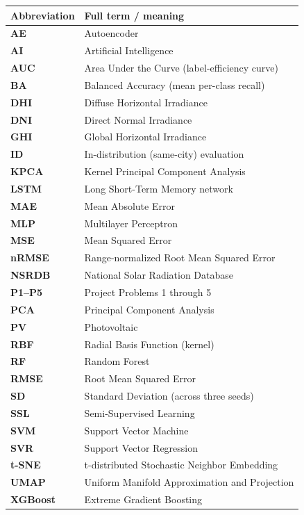 \documentclass[11pt,letterpaper]{article}
\renewcommand{\arraystretch}{1.12}
\begin{document}
\begingroup
\small
\renewcommand{\arraystretch}{1.05}
\setlength{\tabcolsep}{4pt}
\renewcommand{\tabularxcolumn}[1]{m{#1}}
\begin{tabularx}{\textwidth}{@{}>{\bfseries\color{ink}}m{}X@{}}
\toprule
Abbreviation & Full term / meaning \\
\midrule
AE & Autoencoder \\
AI & Artificial Intelligence \\
AUC & Area Under the Curve (label-efficiency curve) \\
BA & Balanced Accuracy (mean per-class recall) \\
DHI & Diffuse Horizontal Irradiance \\
DNI & Direct Normal Irradiance \\
GHI & Global Horizontal Irradiance \\
ID & In-distribution (same-city) evaluation \\
KPCA & Kernel Principal Component Analysis \\
LSTM & Long Short-Term Memory network \\
MAE & Mean Absolute Error \\
MLP & Multilayer Perceptron \\
MSE & Mean Squared Error \\
nRMSE & Range-normalized Root Mean Squared Error \\
NSRDB & National Solar Radiation Database \\
P1--P5 & Project Problems 1 through 5 \\
PCA & Principal Component Analysis \\
PV & Photovoltaic \\
RBF & Radial Basis Function (kernel) \\
RF & Random Forest \\
RMSE & Root Mean Squared Error \\
SD & Standard Deviation (across three seeds) \\
SSL & Semi-Supervised Learning \\
SVM & Support Vector Machine \\
SVR & Support Vector Regression \\
t-SNE & t-distributed Stochastic Neighbor Embedding \\
UMAP & Uniform Manifold Approximation and Projection \\
XGBoost & Extreme Gradient Boosting \\
\bottomrule
\end{tabularx}
\endgroup
\clearpage
\end{document}

